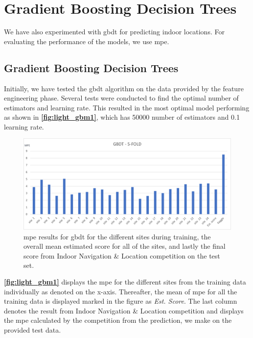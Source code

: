 \section{Gradient Boosting Decision Trees}

We have also experimented with \gls{gbdt} for predicting indoor locations. For evaluating the performance of the models, we use \gls{mpe}.%

\subsection{Gradient Boosting Decision Trees}
Initially, we have tested the \gls{gbdt} algorithm on the data provided by the feature engineering phase. Several tests were conducted to find the optimal number of estimators and learning rate. This resulted in the most optimal model performing as shown in \textbf{\autoref{fig:light_gbm1}}, which has 50000 number of estimators and 0.1 learning rate.

\begin{figure}[H]
    \centering
    \includegraphics[scale=0.6]{Images/Experiments/lightgbm/GBDT-5.png}
    \caption{\gls{mpe} results for \gls{gbdt} for the different sites during training, the overall mean estimated score for all of the sites, and lastly the final score from Indoor Navigation \& Location competition on the test set.}
    \label{fig:light_gbm1}
\end{figure}

\textbf{\autoref{fig:light_gbm1}} displays the \gls{mpe} for the different sites from the training data individually as denoted on the x-axis. Thereafter, the mean of \gls{mpe} for all the training data is displayed marked in the figure as \textit{Est. Score}. The last column denotes the result from Indoor Navigation \& Location competition and displays the \gls{mpe} calculated by the competition from the prediction, we make on the provided test data.

